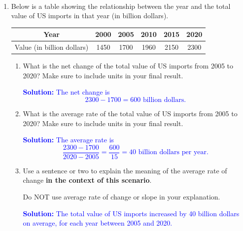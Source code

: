 \documentclass[11pt]{article}
\begin{document}
\vfill


\newpage\,\newpage%


\begin{enumerate}


\item Below is a table showing the relationship between the year and the total value of US imports in that year (in billion dollars).

\begin{table}[h!]
        \centering
        \begin{tabular}{|c|c|c|c|c|c|}
            \hline
            Year & 2000 & 2005 & 2010 & 2015 & 2020 \\
            \hline
            Value (in billion dollars) & 1450 & 1700 & 1960 & 2150 & 2300\\
            \hline
        \end{tabular}
    \end{table}


\begin{enumerate}
    \item What is the net change of the total value of US imports from 2005 to 2020? Make sure to include units in your final result.

    \textcolor{blue}{\textbf{Solution:} The net change is 
    \[
    2300 - 1700 = 600 \text{ billion dollars}.
    \]}

    \vfill

    \item What is the average rate of the total value of US imports from 2005 to 2020? Make sure to include units in your final result.

    \textcolor{blue}{\textbf{Solution:} The average rate is
    \[
    \frac{2300 - 1700}{2020 - 2005} = \frac{600}{15} = 40 \text{ billion dollars per year}.
    \]}

    \vfill

    \item Use a sentence or two to explain the meaning of the average rate of change \textbf{in the context of this scenario}. 
    
    Do NOT use average rate of change or slope in your explanation.

    \textcolor{blue}{\textbf{Solution:} The total value of US imports increased by 40 billion dollars on average, for each year between 2005 and 2020.}


\end{enumerate}
\end{enumerate}
\end{document}
